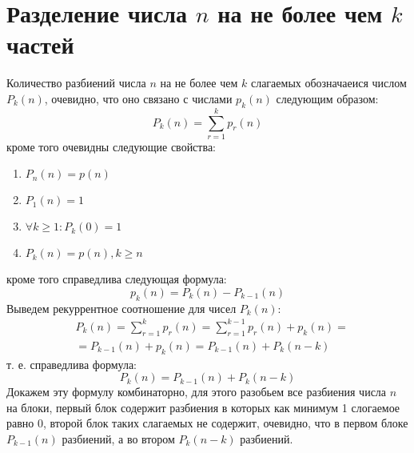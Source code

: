 \section{Разделение числа $n$ на не более чем $k$ частей}

Количество разбиений числа $n$ на не более чем $k$ слагаемых обозначаеися числом $P_k\left(n\right)$, очевидно, что оно связано с числами $p_k\left(n\right)$ следующим образом:
\begin{equation}
	P_k\left(n\right) = \sum_{r=1}^k p_r\left(n\right)
\end{equation}
кроме того очевидны следующие свойства:
\begin{enumerate}
\item $P_n\left(n\right) = p\left(n\right)$

\item $P_1\left(n\right) = 1$

\item $\forall k \ge 1 : P_k\left(0\right) = 1$

\item $P_k\left(n\right) = p\left(n\right), k \ge n$
\end{enumerate}
кроме того справедлива следующая формула:
\begin{equation}
	p_k\left(n\right) = P_k\left(n\right) - P_{k-1}\left(n\right)
\end{equation}
Выведем рекуррентное соотношение для чисел $P_k\left(n\right)$:
\[
	\begin{split}
		&P_k\left(n\right) = \sum_{r=1}^k p_r\left(n\right) = \sum_{r=1}^{k-1}p_r\left(n\right) + p_k\left(n\right) = \\
		& = P_{k-1}\left(n\right) + p_k\left(n\right) = P_{k-1}\left(n\right) + P_k\left(n-k\right)
	\end{split}
\]
т. е. справедлива формула:
\begin{equation}
	P_k\left(n\right) = P_{k-1}\left(n\right) + P_k\left(n-k\right)
\end{equation}
Докажем эту формулу комбинаторно, для этого разобьем все разбиения числа $n$ на блоки, первый блок содержит разбиения в которых как минимум 1 слогаемое равно 0, второй блок таких слагаемых не содержит, очевидно, что в первом блоке $P_{k-1}\left(n\right)$ разбиений, а во втором $P_k\left(n-k\right)$ разбиений.
